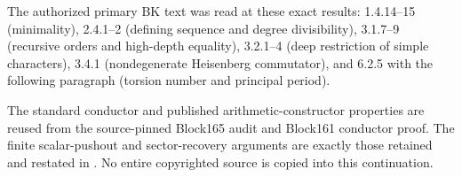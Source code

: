 The authorized primary BK text was read at these exact results:
1.4.14--15 (minimality), 2.4.1--2 (defining sequence and degree
divisibility), 3.1.7--9 (recursive orders and high-depth equality),
3.2.1--4 (deep restriction of simple characters), 3.4.1 (nondegenerate
Heisenberg commutator), and 6.2.5 with the following paragraph (torsion
number and principal period).

The standard conductor and published arithmetic-constructor properties
are reused from the source-pinned Block165 audit and Block161 conductor
proof. The finite scalar-pushout and sector-recovery arguments are
exactly those retained and restated in
. No entire copyrighted source is
copied into this continuation.
